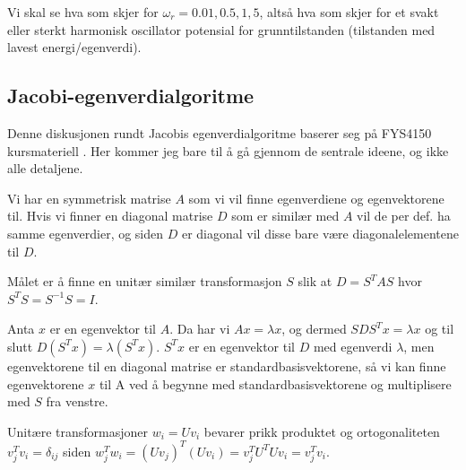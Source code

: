 \documentclass[reprint,english,notitlepage]{revtex4-1}
\begin{document}
	Vi skal se hva som skjer for $\omega_r = 0.01, 0.5, 1, 5$, altså hva som skjer for et svakt eller sterkt harmonisk oscillator potensial for grunntilstanden (tilstanden med lavest energi/egenverdi).
	
\subsection{Jacobi-egenverdialgoritme}
	Denne diskusjonen rundt Jacobis egenverdialgoritme baserer seg på FYS4150 kursmateriell \cite{eigvalEmne}. Her kommer jeg bare til å gå gjennom de sentrale ideene, og ikke alle detaljene.
	
	Vi har en symmetrisk matrise $A$ som vi vil finne egenverdiene og egenvektorene til. Hvis vi finner en diagonal matrise $D$ som er similær med $A$ vil de per def. ha samme egenverdier, og siden $D$ er diagonal vil disse bare være diagonalelementene til $D$.
	
	Målet er å finne en unitær similær transformasjon $S$ slik at $D = S^T A S$ hvor $S^T S = S^{-1}S = I$.
	
	Anta $x$ er en egenvektor til $A$. Da har vi $Ax = \lambda x$, og dermed $SDS^T x = \lambda x$ og til slutt $D(S^Tx) = \lambda (S^Tx)$. $S^T x$ er en egenvektor til $D$ med egenverdi $\lambda$, men egenvektorene til en diagonal matrise er standardbasisvektorene, så vi kan finne egenvektorene $x$ til A ved å begynne med standardbasisvektorene og multiplisere med $S$ fra venstre.
	
	Unitære transformasjoner $w_i = Uv_i$ bevarer prikk produktet og ortogonaliteten $v_j^T v_i = \delta_{ij}$ siden $w_j^T w_i = (Uv_j)^T (Uv_i) = v_j^T U^TUv_i = v_j^T v_i$.
	
\end{document}
